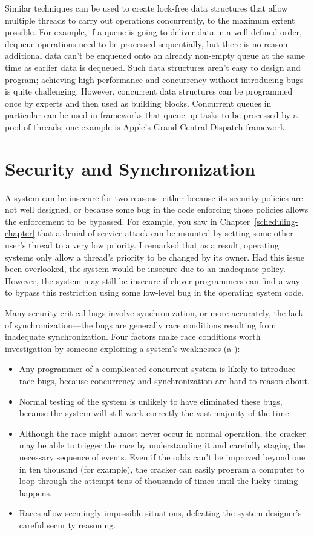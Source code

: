 Similar techniques can be used to create lock-free data structures
that allow multiple threads to carry out operations concurrently, to
the maximum extent possible. For example, if a queue is going to
deliver data in a well-defined order, dequeue operations need to be
processed sequentially, but there is no reason additional data can't
be enqueued onto an already non-empty queue at the same time as
earlier data is dequeued. Such data structures aren't easy to design
and program; achieving high performance and concurrency without
introducing bugs is quite challenging.  However, concurrent data
structures can be programmed once by experts and then used as building
blocks.  Concurrent queues in particular can be used in frameworks
that queue up tasks to be processed by a pool of threads;
one example is Apple's Grand Central Dispatch framework.

\section{Security and Synchronization}\label{synchronization-and-security-section}

A system can be insecure for two reasons: either because its security
policies are not well designed, or because some bug in the code
enforcing those policies allows the enforcement to be bypassed.  For
example, you saw in Chapter~\ref{scheduling-chapter} that a denial of service
attack can be mounted by setting some other user's thread to a very
low priority.  I remarked that as a result, operating systems only
allow a thread's priority to be changed by its owner.  Had this issue
been overlooked, the system would be insecure due to an inadequate
policy.  However, the system may still be insecure if clever programmers
can find a way to bypass this restriction using some low-level bug in
the operating system code.

Many security-critical bugs involve synchronization, or more
accurately, the lack of synchronization---the bugs are generally race
conditions resulting from inadequate synchronization.  Four factors
make race conditions worth investigation by someone exploiting a system's weaknesses
(a ):
\begin{itemize}
\item
Any programmer of a complicated concurrent system is likely to introduce
race bugs, because concurrency and synchronization are hard to reason
about.
\item
Normal testing of the system is unlikely to have eliminated these bugs,
because the system will still work correctly the vast majority of the
time.
\item
Although the race might almost never occur in normal operation, the
cracker may be able to trigger the race by understanding it and
carefully staging the necessary sequence of events.  Even if the odds
can't be improved beyond one in ten thousand (for example), the
cracker can easily program a computer to loop through the attempt tens
of thousands of times until the lucky timing happens.
\item
Races allow seemingly impossible situations, defeating the system
designer's careful security reasoning.
\end{itemize}

